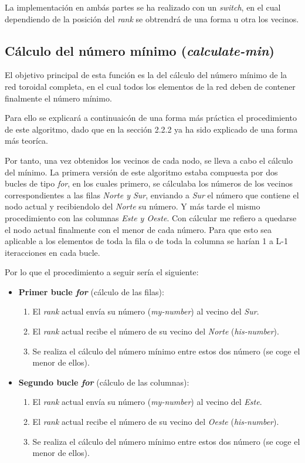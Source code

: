 \documentclass[11pt]{article}
\begin{document}
La implementación en ambás partes se ha realizado con un \textit{switch}, en el cual dependiendo de la posición del \textit{rank} se obtrendrá de una forma u otra los vecinos.


\subsection{Cálculo del número mínimo (\textit{calculate-min})}
El objetivo principal de esta función es la del cálculo del número mínimo de la red toroidal completa, en el cual todos los elementos de la red deben de contener finalmente el número mínimo.

Para ello se explicará a continuaicón de una forma más práctica el procedimiento de este algoritmo, dado que en la sección 2.2.2 ya ha sido explicado de una forma más teoríca.

Por tanto, una vez obtenidos los vecinos de cada nodo, se lleva a cabo el cálculo del mínimo. 
La primera versión de este algoritmo estaba compuesta por dos bucles de tipo \textit{for}, en los cuales primero, se cálculaba los números de los vecinos correspondientes a las filas \textit{Norte y Sur}, enviando a \textit{Sur} el número que contiene el nodo actual y recibiendolo del \textit{Norte} su número. Y más tarde el mismo procedimiento con las columnas \textit{Este y Oeste}. Con cálcular me refiero a quedarse el nodo actual finalmente con el menor de cada número.
Para que esto sea aplicable a los elementos de toda la fila o de toda la columna se harían 1 a L-1 iteracciones en cada bucle.

Por lo que el procedimiento a seguir sería el siguiente:
\begin{itemize}
	\item \textbf{Primer bucle \textit{for}} (cálculo de las filas):
	\begin{enumerate}
		\item El \textit{rank} actual envía su número (\textit{my-number}) al vecino del \textit{Sur}.
		\item El \textit{rank} actual recibe el número de su vecino del \textit{Norte} (\textit{his-number}).
		\item Se realiza el cálculo del número mínimo entre estos dos número (se coge el menor de ellos).
	\end{enumerate}
	
	\item \textbf{Segundo bucle \textit{for}} (cálculo de las columnas):
	\begin{enumerate}
		\item El \textit{rank} actual envía su número (\textit{my-number}) al vecino del \textit{Este}.
		\item El \textit{rank} actual recibe el número de su vecino del \textit{Oeste} (\textit{his-number}).
		\item Se realiza el cálculo del número mínimo entre estos dos número (se coge el menor de ellos).
	\end{enumerate}
\end{itemize}
\end{document}

